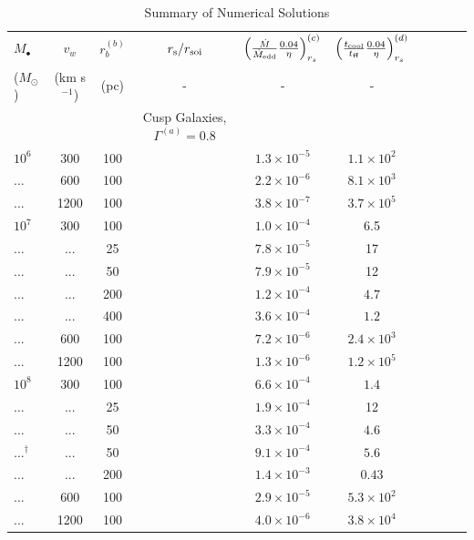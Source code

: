 \documentclass[usenatbib,fleqn]{mn2e}
\begin{document}
\begin{table}
\begin{threeparttable}
\begin{minipage}{18cm}
\caption{Summary of Numerical Solutions}
\begin{tabular}{lccccccccc}
  \hline
  {$M_{\bullet}$} & {$v_{w}$} & {$r_b^{(b)}$} &  $r_{\rm s}/r_{\rm soi}$ &  {$\left(\frac{\dot{M}}{\dot{M}_{\rm edd}}\frac{0.04}{\eta}\right)_{r_{s}}^{(c)}$} & {$\left(\frac{t_{\rm cool}}{t_{\rm ff}}\frac{0.04}{\eta}\right)_{r_s}^{(d)}$}  \\
  ($M_{\odot}$) & (km s$^{-1}$) & (pc) &- & - & - &  & \\ 
\hline
 & & & Cusp Galaxies, $\Gamma^{(a)} = 0.8$ & & & & & \\
  $    10^{ 6 }$ & 300 & 100 & & $ 1.3 \times 10^{ -5 }$ & $ 1.1 \times 10^{ 2 }$ \\
  ... & 600  & 100 & &$ 2.2 \times 10^{ -6 }$ & $ 8.1 \times 10^{ 3 }$ \\
   ...    & 1200  & 100 & &$ 3.8 \times 10^{ -7 }$ & $ 3.7 \times 10^{ 5 }$ \\
  $    10^{ 7 }$ & 300 & 100 & & $ 1.0 \times 10^{ -4 }$ & 6.5 \\
 ...    & ...   & 25 & &$ 7.8 \times 10^{ -5 }$ & 17 \\
 ...      & ...   & 50 & &$ 7.9 \times 10^{ -5 }$ & 12 \\
   ...    & ...   & 200 & &$ 1.2 \times 10^{ -4 }$ & $\mathbf{4.7}$ \\
   ...    & ...   & 400 & &$ 3.6 \times 10^{ -4 }$ & $\mathbf{1.2}$ \\
   ...     & 600  & 100 && $ 7.2 \times 10^{ -6 }$ & $ 2.4 \times 10^{ 3 }$ \\
   ...     & 1200  & 100 && $ 1.3 \times 10^{ -6 }$ & $ 1.2 \times 10^{ 5 }$ \\
  $    10^{ 8 }$ & 300 & 100 & & $ 6.6 \times 10^{ -4 }$ & $\mathbf{1.4}$ \\
...     & ...  & 25 & &$ 1.9 \times 10^{ -4 }$ & 12 \\
   ...     & ...  & 50 & &$ 3.3 \times 10^{ -4 }$ &
  $\mathbf{4.6}$ \\
     ...$^{\dagger}$ & ...  & 50& & $ 9.1 \times 10^{ -4 }$ &
  $\mathbf{5.6}$ \\
   ... & ... & 200 && $ 1.4 \times 10^{ -3 }$ &
  $\mathbf{0.43}$ \\
   ...     & 600  & 100 && $ 2.9 \times 10^{ -5 }$ & $ 5.3 \times 10^{ 2 }$ \\
   ...     & 1200  & 100 && $ 4.0 \times 10^{ -6 }$ & $ 3.8 \times 10^{ 4 }$ \\

\end{tabular}
\end{minipage}
\end{threeparttable}
\end{table}
\end{document}
